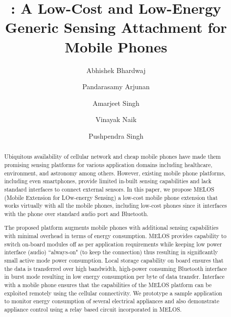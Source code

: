 \documentclass[10pt]{sigplan-proc-varsize}
\author[2]{Abhishek Bhardwaj}
\author[1]{Pandarasamy Arjunan }
\author[1]{Amarjeet Singh }
\author[1]{Vinayak Naik}
\author[1]{Pushpendra Singh\vspace{-3mm}}
\affil[1]{\vspace{-1mm}Indraprastha Institute of Information Technology, New Delhi, India}
\affil[2]{Netaji Subhash Institute of Technology, New Delhi, India\vspace{-4mm}}
\title{\vspace{-8mm} \melos: A Low-Cost and Low-Energy Generic Sensing Attachment for Mobile Phones \vspace{-7mm}}
\newcommand{\melos}{MELOS }
\newcommand{\melosnospace}{MELOS}
\begin{document}
\maketitle


\begin{abstract}
Ubiquitous availability of cellular network and cheap mobile phones have made them promising sensing platforms for various application domains including healthcare, environment, and astronomy among others. However, existing mobile phone platforms, including even smartphones, provide limited in-built sensing capabilities and lack standard interfaces to connect external sensors. In this paper, we propose \melos (Mobile Extension for LOw-energy Sensing) a low-cost mobile phone extension that works virtually with all the mobile phones, including low-cost phones since it interfaces with the phone over standard audio port and Bluetooth. 

The proposed platform augments mobile phones with additional sensing capabilities with minimal overhead in terms of energy consumption. \melos provides capability to switch on-board modules off as per application requirements while keeping low power interface (audio) ``always-on" (to keep the connection) thus resulting in significantly small active mode power consumption. Local storage capability on board ensures that the data is transferred over high bandwidth, high-power consuming Bluetooth interface in burst mode resulting in low energy consumption per byte of data transfer. Interface with a mobile phone ensures that the capabilities of the \melos platform can be exploited remotely using the cellular connectivity. We prototype a sample application to monitor energy consumption of several electrical appliances and also demonstrate appliance control using a relay based circuit incorporated in \melosnospace. 
\end{abstract}

%
%



\end{document}
